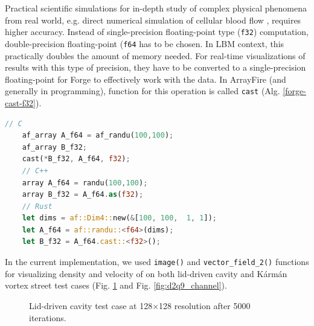 Practical scientific simulations for in-depth study of complex physical phenomena from real world, e.g. direct numerical simulation of cellular blood flow \cite{kotsalosDigitalBloodMassively2019}, requires higher accuracy. Instead of single-precision floating-point type (\texttt{f32}) computation, double-precision floating-point (\texttt{f64} has to be chosen. In LBM context, this practically doubles the amount of memory needed. For real-time visualizations of results with this type of precision, they have to be converted to a single-precision floating-point for Forge to effectively work with the data. In ArrayFire (and generally in programming), function for this operation is called \texttt{cast} (Alg. \ref{forge-cast-f32}).

\begin{lstlisting}[language=Rust, caption={Converting to single precision floating point for Forge visualization in C, C++ and Rust}, label=forge-cast-f32]
	// C
	af_array A_f64 = af_randu(100,100);
	af_array B_f32;
	cast(*B_f32, A_f64, f32);
	// C++
	array A_f64 = randu(100,100);
	array B_f32 = A_f64.as(f32);
	// Rust
	let dims = af::Dim4::new(&[100, 100,  1, 1]);
	let A_f64 = af::randu::<f64>(dims);
	let B_f32 = A_f64.cast::<f32>();
\end{lstlisting}

In the current implementation, we used \texttt{image()} and \texttt{vector_field_2()} functions for visualizing density and velocity of on both lid-driven cavity and Kármán vortex street test cases (Fig. \ref{fig:d2q9_lid} and Fig. \ref{fig:d2q9_channel}).

\begin{figure}[!ht]
	\centering
	\qquad
	\captionsetup{justification=centering}
	\caption{Lid-driven cavity test case at 128$\times$128 resolution after 5000 iterations.}
	\label{fig:d2q9_lid}
\end{figure}

